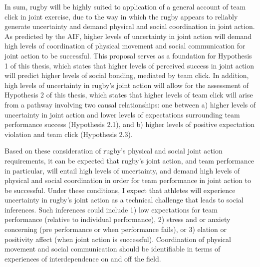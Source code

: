 \begin{CJK}{UTF8}{gbsn}
In sum, rugby will be highly suited to application of a general account of team click in joint exercise, due to the way in which the rugby appears to reliably generate uncertainty and demand physical and social coordination in joint action.  As predicted by the AIF, higher levels of uncertainty in joint action will demand high levels of coordination of physical movement and social communication for joint action to be successful.  This proposal serves as a foundation for Hypothesis 1 of this thesis, which states that higher levels of perceived success in joint action will predict higher levels of social bonding, mediated by team click.  In addition, high levels of uncertainty in rugby's joint action will allow for the assessment of Hypothesis 2 of this thesis, which states that higher levels of team click will arise from a pathway involving two causal relationships: one between a) higher levels of uncertainty in joint action and lower levels of expectations surrounding team performance success (Hypothesis 2.1), and b) higher levels of positive expectation violation and team click (Hypothesis 2.3).

Based on these consideration of rugby's physical and social joint action requirements, it can be expected that rugby's joint action, and team performance in particular, will entail high levels of uncertainty, and demand high levels of physical and social coordination in order for team performance in joint action to be successful.  Under these conditions, I expect that athletes will experience uncertainty in rugby's joint action as a technical challenge that leads to social inferences.  Such inferences could include 1) low expectations for team performance (relative to individual performance), 2) stress and or anxiety concerning (pre performance or when performance fails), or 3) elation or positivity affect (when joint action is successful).  Coordination of physical movement and social communication should be identifiable in terms of experiences of interdependence on and off the field.




\end{CJK}
